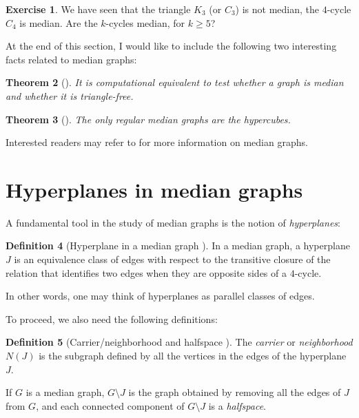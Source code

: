 \documentclass[12pt, a4paper]{article}
\theoremstyle{plain}
\newtheorem{theorem}{Theorem}[section]
\theoremstyle{definition}
\newtheorem{definition}[theorem]{Definition}
\newtheorem{exercise}[theorem]{Exercise}
\theoremstyle{remark}
\begin{document}
    \begin{exercise}
        We have seen that the triangle $K_{3}$ (or $C_{3}$) is not median, the $4$-cycle $C_{4}$ is median. Are the $k$-cycles median, for $k \geq 5$?
    \end{exercise}
    
    At the end of this section, I would like to include the following two interesting facts related to median graphs:
    
    \begin{theorem}[\cite{imrich}]
        It is computational equivalent to test whether a graph is median and whether it is triangle-free.
    \end{theorem}
    
    \begin{theorem}[\cite{mulder}]
        The only regular median graphs are the hypercubes.
    \end{theorem}
    
    Interested readers may refer to \cite{survey} for more information on median graphs.
    
    \section{Hyperplanes in median graphs}
    
    A fundamental tool in the study of median graphs is the notion of \textit{hyperplanes}:
    
    \begin{definition}[Hyperplane in a median graph \cite{genevois}]
        In a median graph, a hyperplane $J$ is an equivalence class of edges with respect to the transitive closure of the relation that identifies two edges when they are opposite sides of a $4$-cycle.
    \end{definition}
    
    In other words, one may think of hyperplanes as parallel classes of edges.
    
    To proceed, we also need the following definitions:
    
    \begin{definition}[Carrier/neighborhood and halfspace \cite{genevois}]
        
        The \textit{carrier} or \textit{neighborhood} $N(J)$ is the subgraph defined by all the vertices in the edges of the hyperplane $J$.
        
        If $G$ is a median graph, $G \setminus J$ is the graph obtained by removing all the edges of $J$ from $G$, and each connected component of $G \setminus J$ is a \textit{halfspace}.
    \end{definition}
    
\end{document}
